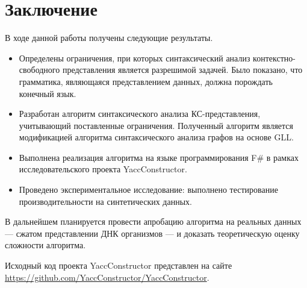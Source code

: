 \section*{Заключение}

В ходе данной работы получены следующие результаты.

\begin{itemize}
	\item Определены ограничения, при которых синтаксический анализ контекстно-свободного представления является разрешимой задачей. Было показано, что грамматика, являющаяся представлением данных, должна порождать конечный язык.
	\item Разработан алгоритм синтаксического анализа КС-представления, учитывающий поставленные ограничения. Полученный алгоритм является модификацией алгоритма синтаксического анализа графов на основе GLL.
	\item Выполнена реализация алгоритма на языке программирования F$\#$ в рамках исследовательского проекта YaccConstructor.
	\item Проведено экспериментальное исследование: выполнено тестирование производительности на синтетических данных.
\end{itemize}  

В дальнейшем планируется провести апробацию алгоритма на реальных данных --- сжатом представлении ДНК организмов --- и доказать теоретическую оценку сложности алгоритма.

Исходный код проекта YaccConstructor представлен на сайте \url{https://github.com/YaccConstructor/YaccConstructor}. 
